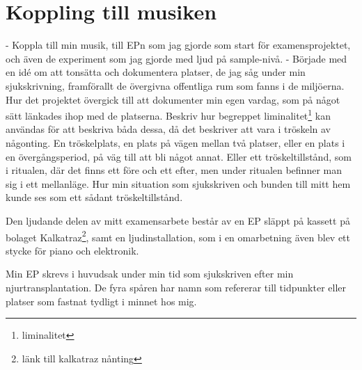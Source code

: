 \documentclass{article}
\begin{document}



\section{Koppling till musiken}
- Koppla till min musik, till EPn som jag gjorde som start för examensprojektet, och även de experiment som
  jag gjorde med ljud på sample-nivå. 
- Började med en idé om att tonsätta och dokumentera platser, de jag såg under min sjukskrivning, framförallt
  de övergivna offentliga rum som fanns i de miljöerna. Hur det projektet övergick till att dokumenter min
  egen vardag, som på något sätt länkades ihop med de platserna. Beskriv hur begreppet
  liminalitet\footnote{liminalitet} kan användas för att beskriva båda dessa, då det beskriver att vara i
  tröskeln av någonting. En tröskelplats, en plats på vägen mellan två platser, eller en plats i en
  övergångsperiod, på väg till att bli något annat. Eller ett tröskeltillstånd, som i ritualen, där det finns
  ett före och ett efter, men under ritualen befinner man sig i ett mellanläge. Hur min situation som
  sjukskriven och bunden till mitt hem kunde ses som ett sådant tröskeltillstånd.

  Den ljudande delen av mitt examensarbete består av en EP släppt på kassett på bolaget
  Kalkatraz\footnote{länk till kalkatraz nånting}, samt en ljudinstallation, som i en omarbetning även blev
  ett stycke för piano och elektronik.

  Min EP skrevs i huvudsak under min tid som sjukskriven efter min njurtransplantation. De fyra spåren har
  namn som refererar till tidpunkter eller platser som fastnat tydligt i minnet hos mig. 
\end{document}
